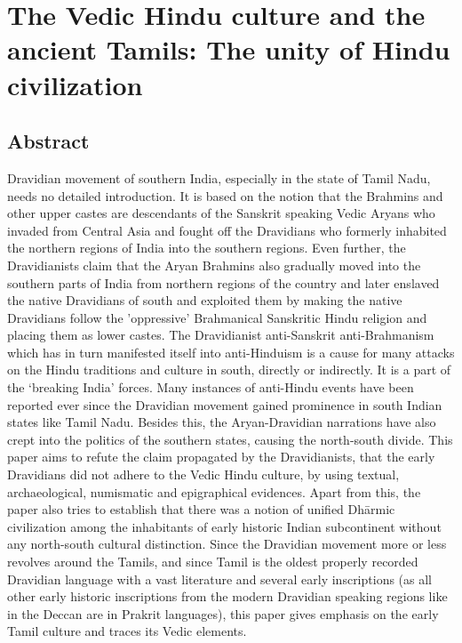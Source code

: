 
\chapter{The Vedic Hindu culture and the ancient Tamils: The unity of Hindu civilization}



\section*{Abstract}

Dravidian movement of southern India, especially in the state of Tamil Nadu, needs no detailed introduction. It is based on the notion that the Brahmins and other upper castes are descendants of the Sanskrit speaking Vedic Aryans who invaded from Central Asia and fought off the Dravidians who formerly inhabited the northern regions of India into the southern regions. Even further, the Dravidianists claim that the Aryan Brahmins also gradually moved into the southern parts of India from northern regions of the country and later enslaved the native Dravidians of south and exploited them by making the native Dravidians follow the 'oppressive' Brahmanical Sanskritic Hindu religion and placing them as lower castes. The Dravidianist anti-Sanskrit anti-Brahmanism which has in turn manifested itself into anti-Hinduism is a cause for many attacks on the Hindu traditions and culture in south, directly or indirectly. It is a part of the ‘breaking India’ forces. Many instances of anti-Hindu events have been reported ever since the Dravidian movement gained prominence in south Indian states like Tamil Nadu. Besides this, the Aryan-Dravidian narrations have also crept into the politics of the southern states, causing the north-south divide. This paper aims to refute the claim propagated by the Dravidianists, that the early Dravidians did not adhere to the Vedic Hindu culture, by using textual, archaeological, numismatic and epigraphical evidences. Apart from this, the paper also tries to establish that there was a notion of unified Dhārmic civilization among the inhabitants of early historic Indian subcontinent without any north-south cultural distinction. Since the Dravidian movement more or less revolves around the Tamils, and since Tamil is the oldest properly recorded Dravidian language with a vast literature and several early inscriptions (as all other early historic inscriptions from the modern Dravidian speaking regions like in the Deccan are in Prakrit languages), this paper gives emphasis on the early Tamil culture and traces its Vedic elements.


